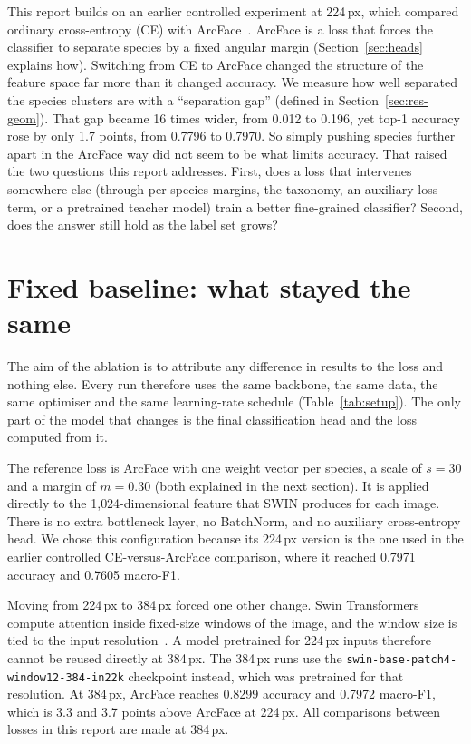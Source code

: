 \documentclass[11pt]{article}
\begin{document}
This report builds on an earlier controlled experiment at 224\,px, which compared
ordinary cross-entropy (CE) with ArcFace~\citep{arcface}. ArcFace is a loss that forces
the classifier to separate species by a fixed angular margin (Section~\ref{sec:heads}
explains how). Switching from CE to ArcFace changed the structure of the feature space
far more than it changed accuracy. We measure how well separated the species clusters
are with a ``separation gap'' (defined in Section~\ref{sec:res-geom}). That gap became
16 times wider, from 0.012 to 0.196, yet top-1 accuracy rose by only 1.7 points, from
0.7796 to 0.7970. So simply pushing species further apart in the ArcFace way did not seem
to be what limits accuracy. That raised the two questions this report addresses. First,
does a loss that intervenes somewhere else (through per-species margins, the taxonomy,
an auxiliary loss term, or a pretrained teacher model) train a better fine-grained
classifier? Second, does the answer still hold as the label set grows?

\section{Fixed baseline: what stayed the same}
\label{sec:baseline}

The aim of the ablation is to attribute any difference in results to the loss and
nothing else. Every run therefore uses the same backbone, the same data, the same
optimiser and the same learning-rate schedule (Table~\ref{tab:setup}). The only part of
the model that changes is the final classification head and the loss computed from it.

The reference loss is ArcFace with one weight vector per species, a scale of $s=30$ and
a margin of $m=0.30$ (both explained in the next section). It is applied directly to
the 1{,}024-dimensional feature that SWIN produces for each image. There is no extra
bottleneck layer, no BatchNorm, and no auxiliary cross-entropy head. We chose this
configuration because its 224\,px version is the one used in the earlier controlled
CE-versus-ArcFace comparison, where it reached 0.7971 accuracy and 0.7605 macro-F1.

Moving from 224\,px to 384\,px forced one other change. Swin Transformers compute
attention inside fixed-size windows of the image, and the window size is tied to the
input resolution~\citep{swin}. A model pretrained for 224\,px inputs therefore cannot be
reused directly at 384\,px. The 384\,px runs use the
\nolinkurl{swin-base-patch4-window12-384-in22k} checkpoint instead, which was pretrained
for that resolution. At 384\,px, ArcFace reaches 0.8299 accuracy and 0.7972 macro-F1,
which is 3.3 and 3.7 points above ArcFace at 224\,px. All comparisons between losses in
this report are made at 384\,px.
\end{document}
